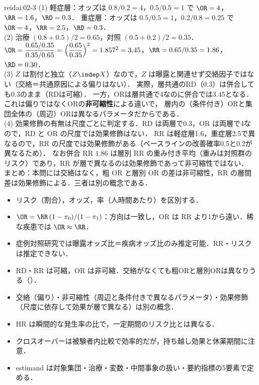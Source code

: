 \begin{kaitou}{reidai:02-3}
(1) 軽症層：オッズは $0.8/0.2=4$，$0.5/0.5=1$ で $\OR=4$，$\RR=1.6$，$\RD=0.3$．
重症層：オッズは $0.5/0.5=1$，$0.2/0.8=0.25$ で $\OR=4$，$\RR=2.5$，$\RD=0.3$．\\
(2) 治療 $(0.8+0.5)/2=0.65$，対照 $(0.5+0.2)/2=0.35$．
$\OR=\dfrac{0.65/0.35}{0.35/0.65}=\Bigl(\dfrac{0.65}{0.35}\Bigr)^2=1.857^2=3.45$，$\RR=0.65/0.35=1.86$，$\RD=0.30$．\\
(3) $Z$ は割付と独立（$Z\indep X$）なので，$Z$ は曝露と関連せず交絡因子ではない（交絡＝共通原因による偏りはない）．
実際，層共通のRD（0.3）は併合しても0.3のまま（RDは可縮）．
一方，ORは層共通で4なのに併合では3.45となる．これは偏りではなくORの\textbf{非可縮性}による違いで，
層内の（条件付き）ORと集団全体の（周辺）ORは異なるパラメータだからである．\\
(4) 効果修飾の有無は尺度ごとに判定する．RD は両層で0.3，OR は両層で4なので，RD と OR の尺度では効果修飾はない．
RR は軽症層1.6，重症層2.5で異なるので，RR の尺度では効果修飾がある（ベースラインの改善確率0.5と0.2が異なるため）．
なお併合 RR $1.86$ は層別 RR の重み付き平均（重みは対照群のリスク）であり，RR が層で異なるのは効果修飾であって非可縮性ではない．\\
まとめ：本問には交絡はなく，粗 OR と層別 OR の差は非可縮性，RR の層間差は効果修飾による．三者は別の概念である．
\end{kaitou}

\begin{summarybox}
\begin{itemize}
\item リスク（割合），オッズ，率（人時間あたり）を区別する．
\item $\OR=\RR\,(1-\pi_0)/(1-\pi_1)$：方向は一致し，OR は RR より1から遠い．稀な疾患では $\OR\approx\RR$．
\item 症例対照研究では曝露オッズ比＝疾病オッズ比のみ推定可能．RR・リスクは推定できない．
\item RD・RR は可縮，OR は非可縮．交絡がなくても粗ORと層別ORは異なりうる（）．
\item 交絡（偏り）・非可縮性（周辺と条件付きで異なるパラメータ）・効果修飾（尺度に依存して効果が層で異なる）は別の概念．
\item HR は瞬間的な発生率の比で，一定期間のリスク比とは異なる．
\item クロスオーバーは被験者内比較で効率的だが，持ち越し効果と休薬期間に注意．
\item estimand は対象集団・治療・変数・中間事象の扱い・要約指標の5要素で定める．
\end{itemize}
\end{summarybox}
